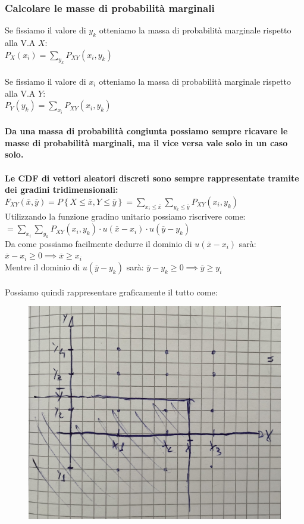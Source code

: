 \documentclass{article}
\begin{document}
\subsubsection{Calcolare le masse di probabilità marginali}
Se fissiamo il valore di $y_k$ otteniamo la massa di probabilità marginale rispetto alla V.A $X$: \\
$P_X(x_i) = \sum_{y_k} P_{XY}(x_i,y_k)$ \\ \\
Se fissiamo il valore di $x_i$ otteniamo la massa di probabilità marginale rispetto alla V.A $Y$: \\
$P_Y(y_k) = \sum_{x_i} P_{XY}(x_i,y_k)$ \\ \\
\textbf{Da una massa di probabilità congiunta possiamo sempre ricavare le masse di probabilità marginali, ma il vice versa vale solo in un caso solo.} \\ \\
\textbf{Le CDF di vettori aleatori discreti sono sempre rappresentate tramite dei gradini tridimensionali:} \\
$F_{XY}(\overline x, \overline y ) = P \left\{X \leq \overline x, Y \leq \overline y \right\} = \sum_{x_i \leq \overline x} \sum_{y_k \leq \overline y} P_{XY}(x_i,y_k)$ \\
Utilizzando la funzione gradino unitario possiamo riscrivere come: \\
$= \sum_{x_i} \sum_{y_k} P_{XY}(x_i,y_k) \cdot u\left(\overline x - x_i \right) \cdot u\left(\overline y - y_k \right)$ \\
Da come possiamo facilmente dedurre il dominio di $u\left(\overline x - x_i \right)$ sarà: $\overline x - x_i \geq 0 \implies \overline x \geq x_i$ \\
Mentre il dominio di $u\left(\overline y - y_k \right)$ sarà: $\overline y - y_k \geq 0 \implies \overline y \geq y_i$ \\ \\
Possiamo quindi rappresentare graficamente il tutto come:
\begin{figure}[ht]
\centering
\includegraphics[scale=0.16]{images/75.VettAleaDisc2.jpeg}
\end{figure} 
\end{document}
